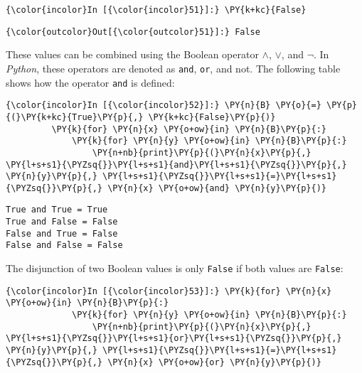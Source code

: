 \begin{Verbatim}[commandchars=\\\{\}]
{\color{incolor}In [{\color{incolor}51}]:} \PY{k+kc}{False}
\end{Verbatim}

\begin{Verbatim}[commandchars=\\\{\}]
{\color{outcolor}Out[{\color{outcolor}51}]:} False
\end{Verbatim}
            
    These values can be combined using the Boolean operator \(\wedge\),
\(\vee\), and \(\neg\). In \textsl{Python}, these operators are denoted as
\texttt{and}, \texttt{or}, and \texttt{}not. The following table shows how the operator \texttt{and} is
defined:

\begin{Verbatim}[commandchars=\\\{\}]
{\color{incolor}In [{\color{incolor}52}]:} \PY{n}{B} \PY{o}{=} \PY{p}{(}\PY{k+kc}{True}\PY{p}{,} \PY{k+kc}{False}\PY{p}{)}
         \PY{k}{for} \PY{n}{x} \PY{o+ow}{in} \PY{n}{B}\PY{p}{:}
             \PY{k}{for} \PY{n}{y} \PY{o+ow}{in} \PY{n}{B}\PY{p}{:}
                 \PY{n+nb}{print}\PY{p}{(}\PY{n}{x}\PY{p}{,} \PY{l+s+s1}{\PYZsq{}}\PY{l+s+s1}{and}\PY{l+s+s1}{\PYZsq{}}\PY{p}{,} \PY{n}{y}\PY{p}{,} \PY{l+s+s1}{\PYZsq{}}\PY{l+s+s1}{=}\PY{l+s+s1}{\PYZsq{}}\PY{p}{,} \PY{n}{x} \PY{o+ow}{and} \PY{n}{y}\PY{p}{)}
\end{Verbatim}

\begin{Verbatim}[commandchars=\\\{\}]
True and True = True
True and False = False
False and True = False
False and False = False
\end{Verbatim}

The disjunction of two Boolean values is only \texttt{False} if both values are
\texttt{False}:

\begin{Verbatim}[commandchars=\\\{\}]
{\color{incolor}In [{\color{incolor}53}]:} \PY{k}{for} \PY{n}{x} \PY{o+ow}{in} \PY{n}{B}\PY{p}{:}
             \PY{k}{for} \PY{n}{y} \PY{o+ow}{in} \PY{n}{B}\PY{p}{:}
                 \PY{n+nb}{print}\PY{p}{(}\PY{n}{x}\PY{p}{,} \PY{l+s+s1}{\PYZsq{}}\PY{l+s+s1}{or}\PY{l+s+s1}{\PYZsq{}}\PY{p}{,} \PY{n}{y}\PY{p}{,} \PY{l+s+s1}{\PYZsq{}}\PY{l+s+s1}{=}\PY{l+s+s1}{\PYZsq{}}\PY{p}{,} \PY{n}{x} \PY{o+ow}{or} \PY{n}{y}\PY{p}{)}
\end{Verbatim}


